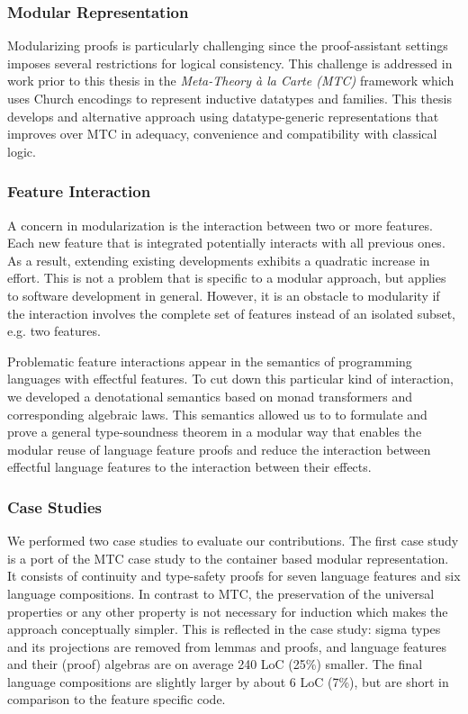 
\subsubsection{Modular Representation}
Modularizing proofs is particularly challenging since the proof-assistant
settings imposes several restrictions for logical consistency. This challenge is
addressed in work prior to this thesis in the \emph{Meta-Theory \`a la Carte
  (MTC)} \cite{mtc} framework which uses Church encodings to represent inductive
datatypes and families. This thesis develops and alternative approach using
datatype-generic representations that improves over MTC in adequacy, convenience
and compatibility with classical logic.

\subsubsection{Feature Interaction}
A concern in modularization is the interaction between two or more features.
Each new feature that is integrated potentially interacts with all previous
ones. As a result, extending existing developments exhibits a quadratic increase
in effort. This is not a problem that is specific to a modular approach, but
applies to software development in general. However, it is an obstacle to
modularity if the interaction involves the complete set of features instead of
an isolated subset, e.g. two features.

Problematic feature interactions appear in the semantics of programming
languages with effectful features. To cut down this particular kind of
interaction, we developed a denotational semantics based on monad transformers
and corresponding algebraic laws. This semantics allowed us to to formulate and
prove a general type-soundness theorem in a modular way that enables the modular
reuse of language feature proofs and reduce the interaction between effectful
language features to the interaction between their effects.

\subsubsection{Case Studies}

We performed two case studies to evaluate our contributions. The first case
study is a port of the MTC case study to the container based modular
representation. It consists of continuity and type-safety proofs for seven
language features and six language compositions. In contrast to MTC, the
preservation of the universal properties or any other property is not necessary
for induction which makes the approach conceptually simpler. This is reflected
in the case study: sigma types and its projections are removed from lemmas and
proofs, and language features and their (proof) algebras are on average 240 LoC
(25\%) smaller. The final language compositions are slightly larger by about 6
LoC (7\%), but are short in comparison to the feature specific code.

